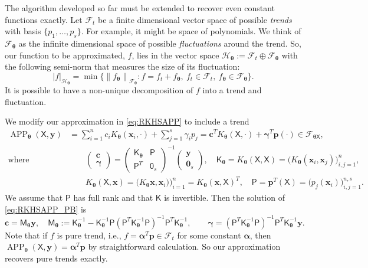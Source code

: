 \documentclass[]{mcom-l}
\theoremstyle{theorem}
\theoremstyle{remark}
\DeclareMathOperator{\APP}{APP}
\newcommand{\mK}{\mathsf{K}}
\newcommand{\mM}{\mathsf{M}}
\newcommand{\mP}{\mathsf{P}}
\newcommand{\mX}{\mathsf{X}}
\newcommand{\mZero}{\mathsf{0}}
\newcommand{\bzero}{\boldsymbol{0}}
\newcommand{\bc}{{\boldsymbol{c}}}
\newcommand{\bx}{{\boldsymbol{x}}}
\newcommand{\bp}{{\boldsymbol{p}}}
\newcommand{\by}{{\boldsymbol{y}}}
\newcommand{\bgamma}{{\boldsymbol{\gamma}}}
\newcommand{\btheta}{{\boldsymbol{\theta}}}
\newcommand{\balpha}{{\boldsymbol{\alpha}}}
\newcommand{\calf}{{\mathcal{F}}}
\newcommand{\calh}{{\mathcal{H}}}
\def\abs#1{\ensuremath{\left \lvert #1 \right \rvert}}
\newcommand{\norm}[2][{}]{\ensuremath{\left \lVert #2 \right \rVert}_{#1}}
\begin{document}
The algorithm developed so far must be extended to recover even constant functions exactly.  Let $\calf_t$ be a finite dimensional vector space of possible \emph{trends} with basis $\{p_1, \ldots, p_s\}$.  For example, it might be space of polynomials.  We think of $\calf_{\btheta}$ as the infinite dimensional space of possible \emph{fluctuations} around the trend.  So, our function to be approximated, $f$, lies in the vector space $\calh_\btheta := \calf_t \oplus \calf_\btheta$ with the following semi-norm that measures the size of its fluctuation:
\begin{equation} \label{eq:seminorm} 
\abs{f}_{\calh_\btheta} = \min \{ \norm[\calf_\btheta] {f_\btheta} : f = f_t + f_\btheta, \ f_t \in \calf_t, \ f_\btheta \in \calf_\btheta \}.
\end{equation}
It is possible to have a non-unique decomposition of $f$ into a trend and fluctuation.

We modify our approximation in \eqref{eq:RKHSAPP} to include a trend
\begin{subequations} \label{eq:RKHSAPP_P}
	\begin{align} 
	\APP_\btheta(\mX,\by) &= \sum_{i=1}^n c_i K_\btheta(\bx_i,\cdot) + \sum_{j=1}^s \gamma_i p_j = \bc^T K_\btheta(\mX,\cdot) + \bgamma^T \bp(\cdot) \in \calf_{\btheta \mX}, \\
	\label{eq:RKHSAPP_PB}
	\text{where } & \qquad \begin{pmatrix} \bc \\ \bgamma \end{pmatrix} = 
	\begin{pmatrix} \mK_\btheta  & \mP \\ \mP^T & \mZero_s \end{pmatrix}^{-1} 
	\begin{pmatrix}\by \\ \bzero_s \end{pmatrix}, 
	\quad \mK_\btheta = K_\btheta(\mX,\mX) = \bigl( K_\btheta(\bx_i,\bx_j) \bigr)_{i,j=1}^n,  \\
	& \qquad  K_\btheta(\mX,\bx) = \bigl(K_\btheta\bx,\bx_i) \bigr)_{i=1}^n =  K_\btheta(\bx, \mX)^T, \quad \mP = \bp^T(\mX) = \bigl( p_j(\bx_i)\bigr )_{i,j=1}^{n,s}.
	\end{align}
\end{subequations}
We assume that $\mP$ has full rank and that $\mK$ is invertible. Then the solution of \eqref{eq:RKHSAPP_PB} is
\begin{equation}
\bc = \mM_\btheta \by, \quad \mM_\btheta := \mK_\btheta^{-1} - \mK_\btheta^{-1}\mP (\mP^T \mK_\btheta^{-1} \mP)^{-1} \mP^T \mK_\btheta^{-1}, \qquad
\bgamma = (\mP^T \mK_\btheta^{-1} \mP)^{-1} \mP^T \mK_\btheta^{-1} \by.
\end{equation}
Note that if $f$ is pure trend, i.e., $f = \balpha^T \bp \in \calf_t$ for some constant $\balpha$, then $\APP_\btheta(\mX,\by) = \balpha^T \bp$ by straightforward calculation.  So our approximation recovers pure trends exactly.
\end{document}
